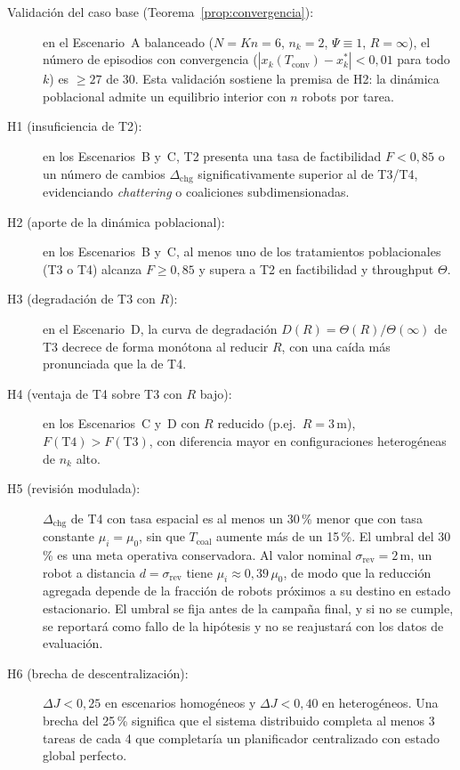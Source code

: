 \begin{description}
  \item[Validación del caso base (Teorema~\ref{prop:convergencia}):] en el
    Escenario~A balanceado ($N = Kn = 6$, $n_k = 2$, $\Psi \equiv 1$, $R = \infty$),
    el número de episodios con convergencia
    ($|x_k(T_{\text{conv}}) - x_k^*| < 0{,}01$ para todo $k$) es $\geq 27$ de 30.
    Esta validación sostiene la premisa de H2: la dinámica poblacional admite un
    equilibrio interior con $n$ robots por tarea.

  \item[H1 (insuficiencia de T2):] en los Escenarios~B y~C, T2 presenta una tasa
    de factibilidad $F < 0{,}85$ o un número de cambios $\Delta_{\text{chg}}$
    significativamente superior al de T3/T4, evidenciando \emph{chattering} o
    coaliciones subdimensionadas.

  \item[H2 (aporte de la dinámica poblacional):] en los Escenarios~B y~C, al menos
    uno de los tratamientos poblacionales (T3 o T4) alcanza $F \geq 0{,}85$ y supera
    a T2 en factibilidad y throughput $\Theta$.

  \item[H3 (degradación de T3 con $R$):] en el Escenario~D, la curva de degradación
    $D(R) = \Theta(R)/\Theta(\infty)$ de T3 decrece de forma monótona al reducir
    $R$, con una caída más pronunciada que la de T4.

  \item[H4 (ventaja de T4 sobre T3 con $R$ bajo):] en los Escenarios~C y~D con $R$
    reducido (p.ej.\ $R = 3\,\text{m}$), $F(\text{T4}) > F(\text{T3})$, con
    diferencia mayor en configuraciones heterogéneas de $n_k$ alto.

  \item[H5 (revisión modulada):] $\Delta_{\text{chg}}$ de T4 con tasa espacial es al
    menos un 30\,\% menor que con tasa constante $\mu_i = \mu_0$, sin que
    $T_{\text{coal}}$ aumente más de un 15\,\%. El umbral del 30\,\% es una meta
    operativa conservadora. Al valor nominal $\sigma_{\text{rev}} = 2\,\text{m}$, un
    robot a distancia $d = \sigma_{\text{rev}}$ tiene $\mu_i \approx 0{,}39\,\mu_0$,
    de modo que la reducción agregada depende de la fracción de robots próximos a su
    destino en estado estacionario. El umbral se fija antes de la campaña final, y si no
    se cumple, se reportará como fallo de la hipótesis y no se reajustará con los datos
    de evaluación.

  \item[H6 (brecha de descentralización):] $\Delta J < 0{,}25$ en escenarios
    homogéneos y $\Delta J < 0{,}40$ en heterogéneos. Una brecha del 25\,\% significa
    que el sistema distribuido completa al menos 3 tareas de cada 4 que completaría
    un planificador centralizado con estado global perfecto.
\end{description}

